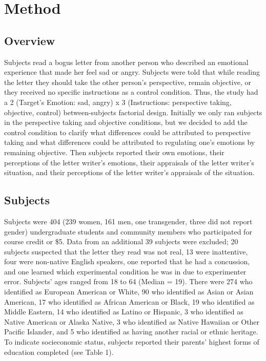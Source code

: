 \documentclass[man,a4paper,noextraspace,apacite]{apa6}\usepackage[]{graphicx}\usepackage[]{color}
\begin{document}
\section{Method}



\subsection{Overview}

    Subjects read a bogus letter from another person who described an emotional experience that made her feel sad or angry. Subjects were told that while reading the letter they should take the other person's perspective, remain objective, or they received no specific instructions as a control condition. Thus, the study had a 2 (Target's Emotion: sad, angry) x 3 (Instructions: perspective taking, objective, control) between-subjects factorial design. Initially we only ran subjects in the perspective taking and objective conditions, but we decided to add the control condition to clarify what differences could be attributed to perspective taking and what differences could be attributed to regulating one's emotions by remaining objective. Then subjects reported their own emotions, their perceptions of the letter writer's emotions, their appraisals of the letter writer's situation, and their perceptions of the letter writer's appraisals of the situation.
    
\subsection{Subjects}

    Subjects were 404 (239 women, 161 men, one transgender, three did not report gender) undergraduate students and community members who participated for course credit or \$5. Data from an additional 39 subjects were excluded; 20 subjects suspected that the letter they read was not real, 13 were inattentive, four were non-native English speakers, one reported that he had a concussion, and one learned which experimental condition he was in due to experimenter error. Subjects' ages ranged from 18 to 64 (Median = 19). There were 274 who identified as European American or White, 90 who identified as Asian or Asian American, 17 who identified as African American or Black, 19 who identified as Middle Eastern, 14 who identified as Latino or Hispanic, 3 who identified as Native American or Alaska Native, 3 who identified as Native Hawaiian or Other Pacific Islander, and 5 who identified as having another racial or ethnic heritage. To indicate socieconomic status, subjects reported their parents' highest forms of education completed (see Table 1).
    
\end{document}

